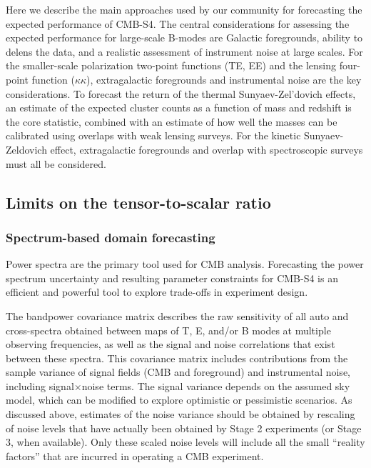 Here we describe the main approaches used by our community for forecasting the expected performance of CMB-S4. The central considerations for assessing the expected performance for large-scale B-modes are Galactic foregrounds, ability to delens the data, and a realistic assessment of instrument noise at large scales. 
For the smaller-scale polarization two-point functions (TE, EE) and the lensing four-point function ($\kappa \kappa$), extragalactic foregrounds and instrumental noise are the key considerations.
To forecast the return of the thermal Sunyaev-Zel'dovich effects, an estimate of the expected cluster counts as a function of mass and redshift is the core statistic, combined with an estimate of how well the masses can be calibrated using overlaps with weak lensing surveys. For the kinetic Sunyaev-Zeldovich effect, extragalactic foregrounds and overlap with spectroscopic surveys must all be considered. 

\subsection{Limits on the tensor-to-scalar ratio}

\subsubsection{Spectrum-based domain forecasting}

Power spectra are the primary tool used for CMB analysis.
Forecasting the power spectrum uncertainty and resulting parameter constraints for CMB-S4 is an efficient and powerful tool to explore trade-offs in experiment design.

The bandpower covariance matrix describes the raw sensitivity of all auto and cross-spectra obtained between maps of T, E, and/or B modes at multiple observing frequencies, as well as the signal and noise correlations that exist between these spectra.
This covariance matrix includes contributions from the sample variance of signal fields (CMB and foreground) and instrumental noise, including signal$\times$noise terms.
The signal variance depends on the assumed sky model, which can be modified to explore optimistic or pessimistic scenarios.
As discussed above, estimates of the noise variance should be obtained by rescaling of noise levels that have actually been obtained by Stage 2 experiments (or Stage 3, when available).
Only these scaled noise levels will include all the small ``reality factors'' that are incurred in operating a CMB experiment.

